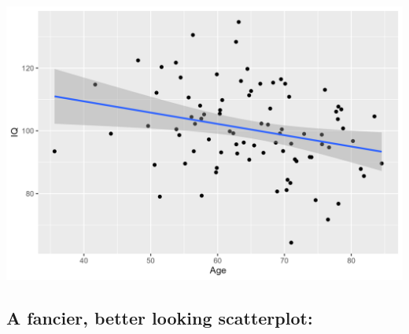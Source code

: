 \documentclass[
]{book}
\begin{document}
\includegraphics[width=27.08in]{Figs/scatter_1}

\subsection*{A fancier, better looking scatterplot:}\label{a-fancier-better-looking-scatterplot}
\end{document}
